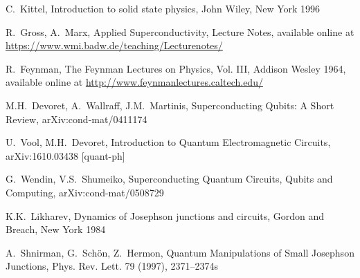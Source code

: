 \documentclass[a4paper, draft]{article}
\theoremstyle{own}
\theoremstyle{remark}
\begin{document}


\begin{thebibliography}{9}


C.~Kittel, Introduction to solid state physics, John Wiley, New York 1996

R.~Gross, A.~Marx, Applied Superconductivity, Lecture Notes, available online at \url{https://www.wmi.badw.de/teaching/Lecturenotes/}

R.~Feynman,
The Feynman Lectures on Physics, Vol. III, Addison Wesley 1964, available online at \url{http://www.feynmanlectures.caltech.edu/}

M.H.~Devoret, A.~Wallraff, J.M.~Martinis,
Superconducting Qubits: A Short Review, arXiv:cond-mat/0411174 

U.~Vool, M.H.~Devoret, 
Introduction to Quantum Electromagnetic Circuits, arXiv:1610.03438 [quant-ph]

G.~Wendin, V.S.~Shumeiko,
Superconducting Quantum Circuits, Qubits and Computing,
arXiv:cond-mat/0508729

K.K.~Likharev, Dynamics of Josephson junctions and circuits,
Gordon and Breach, New York 1984

A.~Shnirman, G.~Sch\"on, Z.~Hermon,
Quantum Manipulations of Small Josephson Junctions,
Phys. Rev. Lett. 79 (1997), 2371--2374s

\end{thebibliography}
\end{document}
